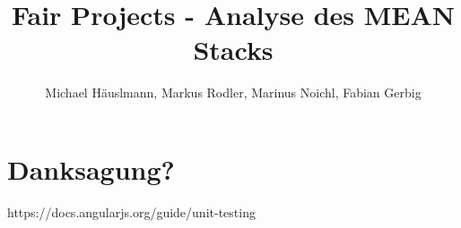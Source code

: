 \documentclass[twoside=true, %
  DIV=15,%
  BCOR=15mm, %
  chapterprefix=false,
  headinclude=true,
  footinclude=false,
  pagesize,%
  fontsize=11pt,%
  paper=a4,%
  bibliography=totoc,%
  index=totoc,%
  cleardoublepage=plain,%
  headings=big,%
  listof=flat,%
  numbers=noenddot
  ]{scrbook}
\author{Michael Häuslmann, Markus Rodler, Marinus Noichl, Fabian Gerbig}
\title{Fair Projects - Analyse des MEAN Stacks}
\begin{document}
\maketitle
\newpage
\tableofcontents
















\appendix

\section{Danksagung?}\label{danksagung}

\begin{thebibliography}{9}
	
	  https://docs.angularjs.org/guide/unit-testing
	
\end{thebibliography}
\end{document}
